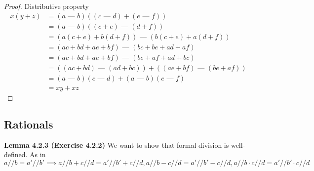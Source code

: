 \documentclass[answers,12pt]{exam}
\newcommand{\fakeminus}{\text{ --- }}
\begin{document}
\begin{solution}
\begin{proof}
    Distributive property
    \begin{align*}
        x(y+z) &= (a \fakeminus b)((c \fakeminus d) + (e \fakeminus f)) \\
        &= (a \fakeminus b) ((c+e) \fakeminus (d+f)) \\\
        &= (a(c+e) + b(d+f)) \fakeminus (b(c+e) + a(d+f)) \\
        &= (ac + bd + ae + bf) \fakeminus (bc + be + ad + af) \\
        &= (ac + bd + ae + bf) \fakeminus (be + af + ad + bc) \\
        &= ((ac +bd) \fakeminus (ad + bc)) + ((ae + bf) \fakeminus (be + af)) \\
        &= (a \fakeminus b)(c \fakeminus d) + (a \fakeminus b)(e \fakeminus f) \\
        &= xy + xz
    \end{align*}
\end{proof}
\end{solution}

\subsection{Rationals}

\textbf{Lemma 4.2.3 (Exercise 4.2.2)} 
We want to show that formal division is well-defined.
As in $a//b = a'//b' \implies a//b + c//d = a'//b' + c//d, a//b-c//d = a'//b'-c//d, a//b \cdot c//d = a'//b' \cdot c//d$
\end{document}
